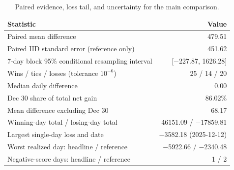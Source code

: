 \begin{table}[!htbp]
\centering\small
\caption{Paired evidence, loss tail, and uncertainty for the main comparison.}\label{tab:paired}
\begin{tabularx}{\linewidth}{@{}Xr@{}}
\toprule
Statistic & Value \\
\midrule
Paired mean difference & 479.51 \\
Paired IID standard error (reference only) & 451.62 \\
7-day block 95\% conditional resampling interval & [$-$227.87, 1626.28] \\
Wins / ties / losses (tolerance $10^{-6}$) & 25 / 14 / 20 \\
Median daily difference & 0.00 \\
Dec 30 share of total net gain & 86.02\% \\
Mean difference excluding Dec 30 & 68.17 \\
Winning-day total / losing-day total & 46151.09 / $-$17859.81 \\
Largest single-day loss and date & $-$3582.18 (2025-12-12) \\
Worst realized day: headline / reference & $-$5922.66 / $-$2340.48 \\
Negative-score days: headline / reference & 1 / 2 \\
\bottomrule
\end{tabularx}
\par\vspace{3pt}{\footnotesize Date exclusion is a post hoc sensitivity analysis; the primary result retains all 59 days. Intervals do not correct for historical evaluation exposure. The worst-day and negative-day rows describe realized downside in this period; they are not a tail-risk model.}
\end{table}
